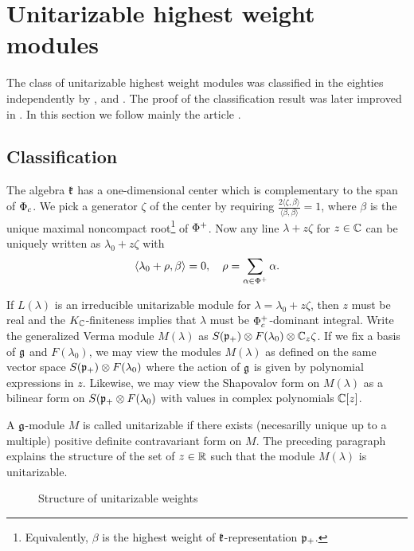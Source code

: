 \chapter{Unitarizable highest weight modules}

The class of unitarizable highest weight modules was classified in the eighties independently by \cite{jakobsen_hans_plesner_hermitian_1983}, \cite{zuckermann} and \cite{enright_classification_1983}. The proof of the classification result was later improved in \cite{joseph_annihilators_1992}. In this section we follow mainly the article  \cite{enright_classification_1983}.

\section{Classification}

The algebra $\mathfrak{k}$ has a one-dimensional center which is complementary to the span of $\Phi_c$. We pick a generator $\zeta$ of the center by requiring $\frac{2 \langle \zeta,\beta \rangle}{\langle \beta, \beta \rangle} = 1$, where $\beta$ is the unique maximal noncompact root\footnote{Equivalently, $\beta$ is the highest weight of $\mathfrak{k}$-representation $\mathfrak{p}_+$.} of $\Phi^+$. Now any line $\lambda+z\zeta$ for $z\in\mathbb{C}$ can be uniquely written as $\lambda_0 + z\zeta$ with
\[
 \langle \lambda_0 + \rho,\beta \rangle = 0, \quad \rho =\sum_{\alpha\in\Phi^+} \alpha.
\]

If $L(\lambda)$ is an irreducible unitarizable module for $\lambda=\lambda_0+z\zeta$, then $z$ must be real and the $K_{\mathbb{C}}$-finiteness implies that $\lambda$ must be $\Phi^+_c$-dominant integral. Write the generalized Verma module $M(\lambda)$ as $S(\mathfrak{p}_+)\otimes F(\lambda_0) \otimes \mathbb{C}_z\zeta$. If we fix a basis of $\mathfrak{g}$ and $F(\lambda_0)$, we may view the modules $M(\lambda)$ as defined on the same vector space $S(\mathfrak{p}_+)\otimes F(\lambda_0)$ where the action of $\mathfrak{g}$ is given by polynomial expressions in $z$. Likewise, we may view the Shapovalov form on $M(\lambda)$ as a bilinear form on $S(\mathfrak{p}_+\otimes F(\lambda_0)$ with values in complex polynomials $\mathbb{C}[z]$.

A $\mathfrak{g}$-module $M$ is called unitarizable if there exists (necesarilly unique up to a multiple) positive definite contravariant form on $M$. The preceding paragraph explains the structure of the set of $z\in\mathbb{R}$ such that the module $M(\lambda)$ is unitarizable.

\begin{figure}[h]\label{fig:struct}
  \begin{center}
  \end{center}\caption{Structure of unitarizable weights} %
\end{figure}

